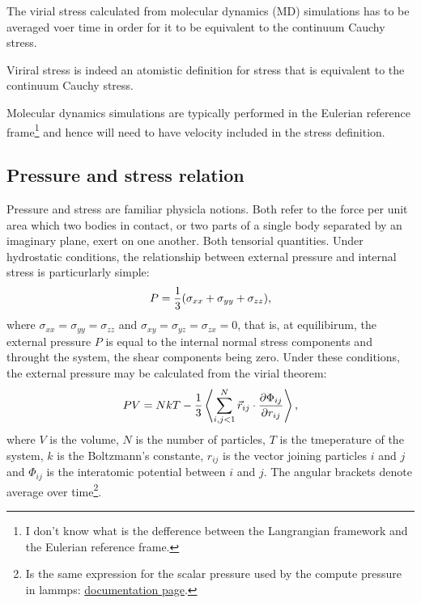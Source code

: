 \documentclass[../../main-notes.tex]{subfiles}
\begin{document}
The virial stress calculated from molecular dynamics (MD) simulations has to be averaged voer time in order for it to be equivalent to the continuum Cauchy stress\citep{Subramaniyan_Sun_2008}.

Viriral stress is indeed an atomistic definition for stress that is equivalent to the continuum Cauchy stress.


Molecular dynamics simulations are typically performed in the Eulerian reference frame\footnote{I don't know what is the defference between the Langrangian framework and the Eulerian reference frame.} and hence will need to have velocity included in the stress definition.

\subsection{Pressure and stress relation}

Pressure and stress are familiar physicla notions. 
Both refer to the force per unit area which two bodies in contact, or two parts of a single body separated by an imaginary plane, exert on one another.
Both tensorial quantities\citep{Tsai_1979}.
Under hydrostatic conditions, the relationship between external pressure and internal stress is particurlarly simple:
\begin{gather}
    P = \frac{1}{3}\qty(\sigma_{xx}+\sigma_{yy}+\sigma_{zz}),
\end{gather}
where $\sigma_{xx}=\sigma_{yy}=\sigma_{zz}$ and $\sigma_{xy}=\sigma_{yz}=\sigma_{zx}=0$, that is, at equilibirum, the external pressure $P$ is equal to the internal normal stress components and throught the system, the shear components being zero.
Under these conditions, the external pressure may be calculated from the virial theorem:
\begin{gather}
    PV = NkT-\frac{1}{3}\left\langle\sum_{i,j<1}^N\vec{r}_{ij}\cdot\pdv{\Phi_{ij}}{r_{ij}}\right\rangle,
\end{gather}
where $V$ is the volume, $N$ is the number of particles, $T$ is the tmeperature of the system, $k$ is the Boltzmann's constante, $r_{ij}$  is the vector joining particles $i$ and $j$ and $\Phi_{ij}$ is the interatomic potential between $i$ and $j$.
The angular brackets denote average over time\footnote{Is the same expression for the scalar pressure used by the compute pressure in lammps: \href{https://docs.lammps.org/compute_pressure.html}{documentation page}.}.
\end{document}
